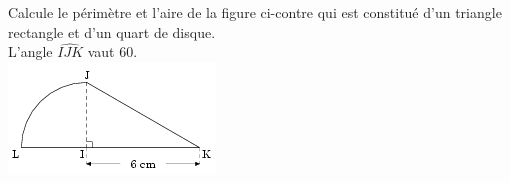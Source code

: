 
\begin{multicols}{2}
Calcule le périmètre et l'aire de la figure
ci-contre qui est constitué d'un triangle rectangle et d'un quart de
disque.\\L'angle $\widehat{IJK}$ vaut 60\degres.\\
\includegraphics[scale=1]{TR-210} 
\end{multicols}